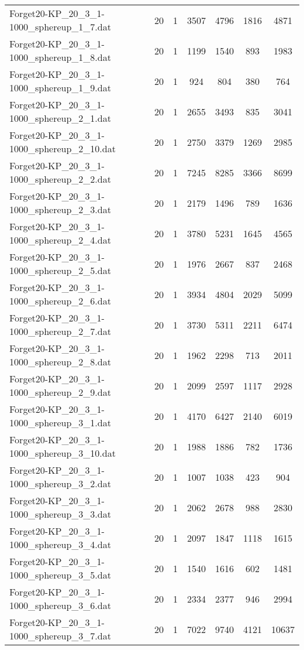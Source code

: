 \begin{table}[!ht]
\begin{tabular}{lcccccc}
Forget20-KP\_20\_3\_1-1000\_sphereup\_1\_7.dat & 20 & 1 & 3507 & 4796 & 1816 & 4871 \\
Forget20-KP\_20\_3\_1-1000\_sphereup\_1\_8.dat & 20 & 1 & 1199 & 1540 & 893 & 1983 \\
Forget20-KP\_20\_3\_1-1000\_sphereup\_1\_9.dat & 20 & 1 & 924 & 804 & 380 & 764 \\
Forget20-KP\_20\_3\_1-1000\_sphereup\_2\_1.dat & 20 & 1 & 2655 & 3493 & 835 & 3041 \\
Forget20-KP\_20\_3\_1-1000\_sphereup\_2\_10.dat & 20 & 1 & 2750 & 3379 & 1269 & 2985 \\
Forget20-KP\_20\_3\_1-1000\_sphereup\_2\_2.dat & 20 & 1 & 7245 & 8285 & 3366 & 8699 \\
Forget20-KP\_20\_3\_1-1000\_sphereup\_2\_3.dat & 20 & 1 & 2179 & 1496 & 789 & 1636 \\
Forget20-KP\_20\_3\_1-1000\_sphereup\_2\_4.dat & 20 & 1 & 3780 & 5231 & 1645 & 4565 \\
Forget20-KP\_20\_3\_1-1000\_sphereup\_2\_5.dat & 20 & 1 & 1976 & 2667 & 837 & 2468 \\
Forget20-KP\_20\_3\_1-1000\_sphereup\_2\_6.dat & 20 & 1 & 3934 & 4804 & 2029 & 5099 \\
Forget20-KP\_20\_3\_1-1000\_sphereup\_2\_7.dat & 20 & 1 & 3730 & 5311 & 2211 & 6474 \\
Forget20-KP\_20\_3\_1-1000\_sphereup\_2\_8.dat & 20 & 1 & 1962 & 2298 & 713 & 2011 \\
Forget20-KP\_20\_3\_1-1000\_sphereup\_2\_9.dat & 20 & 1 & 2099 & 2597 & 1117 & 2928 \\
Forget20-KP\_20\_3\_1-1000\_sphereup\_3\_1.dat & 20 & 1 & 4170 & 6427 & 2140 & 6019 \\
Forget20-KP\_20\_3\_1-1000\_sphereup\_3\_10.dat & 20 & 1 & 1988 & 1886 & 782 & 1736 \\
Forget20-KP\_20\_3\_1-1000\_sphereup\_3\_2.dat & 20 & 1 & 1007 & 1038 & 423 & 904 \\
Forget20-KP\_20\_3\_1-1000\_sphereup\_3\_3.dat & 20 & 1 & 2062 & 2678 & 988 & 2830 \\
Forget20-KP\_20\_3\_1-1000\_sphereup\_3\_4.dat & 20 & 1 & 2097 & 1847 & 1118 & 1615 \\
Forget20-KP\_20\_3\_1-1000\_sphereup\_3\_5.dat & 20 & 1 & 1540 & 1616 & 602 & 1481 \\
Forget20-KP\_20\_3\_1-1000\_sphereup\_3\_6.dat & 20 & 1 & 2334 & 2377 & 946 & 2994 \\
Forget20-KP\_20\_3\_1-1000\_sphereup\_3\_7.dat & 20 & 1 & 7022 & 9740 & 4121 & 10637 \\

\end{tabular}
\end{table}

